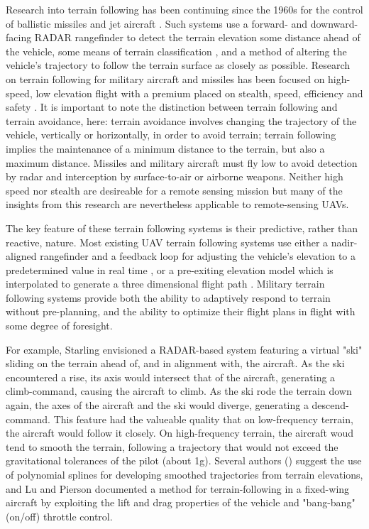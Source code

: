 \documentclass[10pt,a4paper]{report}
\begin{document}
Research into terrain following has been continuing since the 1960s for the control of ballistic missiles and jet aircraft \cite{KRACHMALNICK1968,Starling1971,Cunningham1980}. Such systems use a forward- and downward-facing RADAR rangefinder to detect the terrain elevation some distance ahead of the vehicle, some means of terrain classification \cite{Cunningham1980}, and a method of altering the vehicle's trajectory to follow the terrain surface as closely as possible. Research on terrain following for military aircraft and missiles has been focused on high-speed, low elevation flight with a premium placed on stealth, speed, efficiency and safety \cite{KRACHMALNICK1968}. It is important to note the distinction between terrain following and terrain avoidance, here: terrain avoidance involves changing the trajectory of the vehicle, vertically or horizontally, in order to avoid terrain; terrain following implies the maintenance of a minimum distance to the terrain, but also a maximum distance. Missiles and military aircraft must fly low to avoid detection by radar and interception by surface-to-air or airborne weapons. Neither high speed nor stealth are desireable for a remote sensing mission but many of the insights from this research are nevertheless applicable to remote-sensing UAVs.

The key feature of these terrain following systems is their predictive, rather than reactive, nature. Most existing UAV terrain following systems use either a nadir-aligned rangefinder and a feedback loop for adjusting the vehicle's elevation to a predetermined value in real time \cite{ArduPilot2017}, or a pre-exiting elevation model which is interpolated to generate a three dimensional flight path \cite{ArduPilot2017,Samar2011}. Military terrain following systems provide both the ability to adaptively respond to terrain without pre-planning, and the ability to optimize their flight plans in flight with some degree of foresight. 

For example, Starling \cite{Starling1971} envisioned a RADAR-based system featuring a virtual "ski" sliding on the terrain ahead of, and in alignment with, the aircraft. As the ski encountered a rise, its axis would intersect that of the aircraft, generating a climb-command, causing the aircraft to climb. As the ski rode the terrain down again, the axes of the aircraft and the ski would diverge, generating a descend-command. This feature had the valueable quality that on low-frequency terrain, the aircraft would follow it closely. On high-frequency terrain, the aircraft woud tend to smooth the terrain, following a trajectory that would not exceed the gravitational tolerances of the pilot (about 1g). Several authors (\cite{MENON1991,Popovic2017,Lu1995,Rahim2011,Samar2011}) suggest the use of polynomial splines for developing smoothed trajectories from terrain elevations, and Lu and Pierson \cite{Lu1995} documented a method for terrain-following in a fixed-wing aircraft by exploiting the lift and drag properties of the vehicle and "bang-bang" (on/off) throttle control. 
\end{document}
